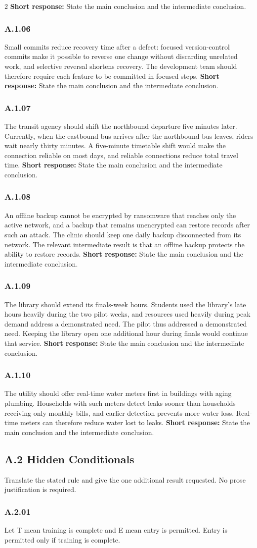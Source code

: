 \documentclass[10pt]{extarticle}
\newcommand{\bankitem}[1]{\subsubsection*{#1}}
\begin{document}
\begin{multicols}{2}
\textbf{Short response:} State the main conclusion and the intermediate conclusion.
\bankitem{A.1.06}
Small commits reduce recovery time after a defect: focused version-control commits make it possible to reverse one change without discarding unrelated work, and selective reversal shortens recovery. The development team should therefore require each feature to be committed in focused steps.
\textbf{Short response:} State the main conclusion and the intermediate conclusion.
\bankitem{A.1.07}
The transit agency should shift the northbound departure five minutes later. Currently, when the eastbound bus arrives after the northbound bus leaves, riders wait nearly thirty minutes. A five-minute timetable shift would make the connection reliable on most days, and reliable connections reduce total travel time.
\textbf{Short response:} State the main conclusion and the intermediate conclusion.
\bankitem{A.1.08}
An offline backup cannot be encrypted by ransomware that reaches only the active network, and a backup that remains unencrypted can restore records after such an attack. The clinic should keep one daily backup disconnected from its network. The relevant intermediate result is that an offline backup protects the ability to restore records.
\textbf{Short response:} State the main conclusion and the intermediate conclusion.
\bankitem{A.1.09}
The library should extend its finals-week hours. Students used the library's late hours heavily during the two pilot weeks, and resources used heavily during peak demand address a demonstrated need. The pilot thus addressed a demonstrated need. Keeping the library open one additional hour during finals would continue that service.
\textbf{Short response:} State the main conclusion and the intermediate conclusion.
\bankitem{A.1.10}
The utility should offer real-time water meters first in buildings with aging plumbing. Households with such meters detect leaks sooner than households receiving only monthly bills, and earlier detection prevents more water loss. Real-time meters can therefore reduce water lost to leaks.
\textbf{Short response:} State the main conclusion and the intermediate conclusion.
\subsection*{A.2 Hidden Conditionals}
Translate the stated rule and give the one additional result requested. No prose
justification is required.
\bankitem{A.2.01}
Let T mean training is complete and E mean entry is permitted. Entry is permitted only if training is complete.


\end{multicols}
\end{document}
